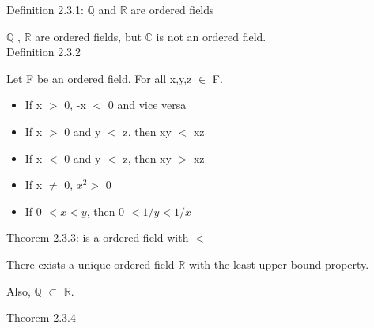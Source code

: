 { \color{blue} Definition 2.3.1: $ \mathbb{Q} $ and $ \mathbb{R} $ are ordered fields } 

\qquad $ \mathbb{Q} $ , $ \mathbb{R} $ are ordered fields, but $ \mathbb{C} $ is not an ordered field. \\

{ \color{blue} Definition 2.3.2} 

\qquad Let F be an ordered field. For all x,y,z $\in$ F.
\begin{itemize}[leftmargin=2cm]
	\item If x $>$ 0, -x $<$ 0 and vice versa
	\item If x $>$ 0 and y $<$ z, then xy $<$ xz
	\item If x $ < $ 0 and y $ < $ z, then xy $ > $ xz
	\item If x $\neq$ 0, $x^2 > $ 0
	\item If 0 $< x < y$, then 0 $< 1/y < 1/x$
\end{itemize}

{\color{red} Theorem 2.3.3:  is a ordered field with $<$ }

\qquad There exists a unique ordered field $ \mathbb{R} $ with the least upper bound property.

\qquad Also, $ \mathbb{Q} $  $\subset$ $ \mathbb{R} $. \\

\newpage

{\color{red} Theorem 2.3.4}

